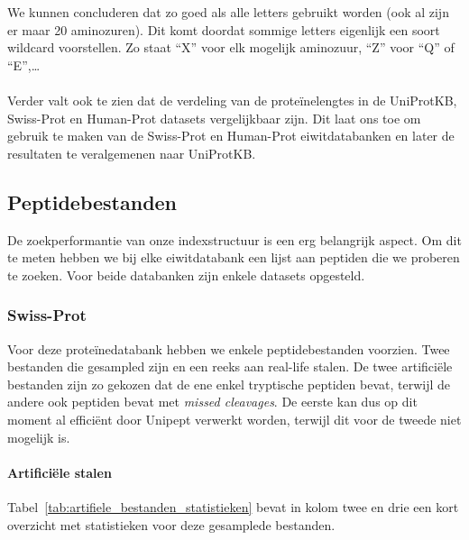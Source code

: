 We kunnen concluderen dat zo goed als alle letters gebruikt worden (ook al zijn er maar 20 aminozuren).
Dit komt doordat sommige letters eigenlijk een soort wildcard voorstellen.
Zo staat ``X'' voor elk mogelijk aminozuur, ``Z'' voor ``Q'' of ``E'',\ldots
\\ \\
Verder valt ook te zien dat de verdeling van de proteïnelengtes in de UniProtKB, Swiss-Prot en Human-Prot datasets vergelijkbaar zijn.
Dit laat ons toe om gebruik te maken van de Swiss-Prot en Human-Prot eiwitdatabanken en later de resultaten te veralgemenen naar UniProtKB\@.

\subsection{Peptidebestanden}\label{subsec:peptide-zoek-bestanden}
De zoekperformantie van onze indexstructuur is een erg belangrijk aspect.
Om dit te meten hebben we bij elke eiwitdatabank een lijst aan peptiden die we proberen te zoeken.
Voor beide databanken zijn enkele datasets opgesteld.

\subsubsection{Swiss-Prot}
Voor deze proteïnedatabank hebben we enkele peptidebestanden voorzien.
Twee bestanden die gesampled zijn en een reeks aan real-life stalen.
De twee artificiële bestanden zijn zo gekozen dat de ene enkel tryptische peptiden bevat, terwijl de andere ook peptiden bevat met \textit{missed cleavages}.
De eerste kan dus op dit moment al efficiënt door Unipept verwerkt worden, terwijl dit voor de tweede niet mogelijk is.

\paragraph{Artificiële stalen}
Tabel~\ref{tab:artifiele_bestanden_statistieken} bevat in kolom twee en drie een kort overzicht met statistieken voor deze gesamplede bestanden.

